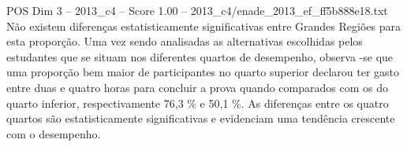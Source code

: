 \begin{textsample}{POS Dim 3 – 2013\_c4 – Score 1.00 – 2013\_c4/enade\_2013\_ef\_ff5b888e18.txt}
Não existem diferenças estatisticamente significativas entre Grandes Regiões para esta proporção.
Uma vez sendo analisadas as alternativas escolhidas pelos estudantes que se situam nos diferentes quartos de desempenho, observa -se que uma proporção bem maior de participantes no quarto superior declarou ter gasto entre duas e quatro horas para concluir a prova quando comparados com os do quarto inferior, respectivamente 76,3 \% e 50,1 \%.
As diferenças entre os quatro quartos são estatisticamente significativas e evidenciam uma tendência crescente com o desempenho.

\end{textsample}
